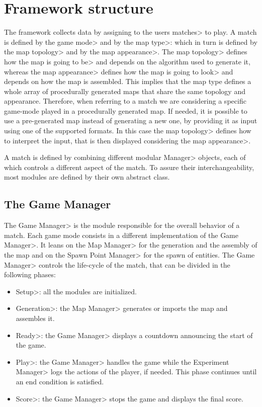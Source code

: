 
\section{Framework structure}

The framework collects data by assigning to the users \<matches> to play. A match is defined by the \<game mode> and by the \<map type>: which in turn is defined by the \<map topology> and by the \<map appearance>. The \<map topology> defines how the map is going to \<be> and depends on the algorithm used to generate it, whereas the \<map appearance> defines how the map is going to \<look> and depends on how the map is assembled. This implies that the map type defines a whole array of procedurally generated maps that share the same topology and appearance. Therefore, when referring to a match we are considering a specific game-mode played in a procedurally generated map. If needed, it is possible to use a pre-generated map instead of generating a new one, by providing it as input using one of the supported formats. In this case the \<map topology> defines how to interpret the input, that is then displayed considering the \<map appearance>.

\par

A match is defined by combining different modular \<Manager> objects, each of which controls a different aspect of the match. To assure their interchangeability, most modules are defined by their own abstract class.


\subsection{The Game Manager}

The \<Game Manager> is the module responsible for the overall behavior of a match. Each game mode consists in a different implementation of the \<Game Manager>. It leans on the \<Map Manager> for the generation and the assembly of the map and on the \<Spawn Point Manager> for the spawn of entities. The \<Game Manager> controls the life-cycle of the match, that can be divided in the following phases:

\begin{itemize}
\item \<Setup>: all the modules are initialized.
\item \<Generation>: the \<Map Manager> generates or imports the map and assembles it.
\item \<Ready>: the \<Game Manager> displays a countdown announcing the start of the game.
\item \<Play>: the \<Game Manager> handles the game while the \<Experiment Manager> logs the actions of the player, if needed. This phase continues until an end condition is satisfied.
\item \<Score>: the \<Game Manager> stops the game and displays the final score.
\end{itemize}

